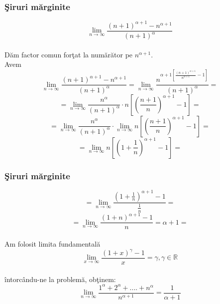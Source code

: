 \documentclass{beamer}
\theoremstyle{plain}
\begin{document}
\frame
{
\frametitle{\c Siruri m\u arginite}
\begin{displaymath}
 \lim_{n \to \infty }\frac{\left ( n+1 \right )^{\alpha +1}-n^{\alpha +1}}{\left ( n+1 \right )^{\alpha }}
\end{displaymath}
\\ D\u am factor comun for\c tat la num\u ar\u ator pe \(n^{\alpha +1}\). 
\\ Avem 
\begin{displaymath}
 \lim_{n \to \infty }\frac{\left ( n+1 \right )^{\alpha +1}-n^{\alpha +1}}{\left ( n+1 \right )^{\alpha }} = \lim_{n \to \infty }\frac{n^{\alpha +1\left [ \frac{\left ( n+1 \right )^{\alpha +1}}{n^{\alpha +1}} -1\right ]}}{\left ( n+1 \right )^{\alpha }} = 
\end{displaymath}
\begin{displaymath}
 = \lim_{n \to \infty }\frac{n^{\alpha }}{\left ( n+1 \right )^{\alpha }}\cdot n\left [ \left ( \frac{n+1}{n} \right )^{\alpha +1}-1 \right ] = 
\end{displaymath}
\begin{displaymath}
 =\lim_{n \to \infty }\frac{n^{\alpha }}{\left ( n+1 \right )^{\alpha }}\cdot \lim_{n \to \infty }n\left [ \left ( \frac{n+1}{n} \right )^{\alpha +1} -1\right ]=
\end{displaymath}
\begin{displaymath}
 =\lim_{n \to \infty }n\left [ \left ( 1+\frac{1}{n} \right )^{\alpha +1}-1 \right ]= 
\end{displaymath}
}
\frame
{
\frametitle{\c Siruri m\u arginite}
\begin{displaymath}
 = \lim_{n \to \infty }\frac{\left ( 1+\frac{1}{n} \right )^{\alpha +1}-1}{\frac{1}{n}}=
\end{displaymath}
\begin{displaymath}
 =\lim_{n \to \infty }\frac{\left ( 1+n \right )^{\alpha +1}-1}{n}= \alpha +1=
\end{displaymath}
\\ Am folosit limita fundamental\u a 
\begin{displaymath}
 \lim_{x \to \infty }\frac{\left ( 1+x \right )^{\gamma }-1}{x} = \gamma ,\gamma \in \mathbb{R}
\end{displaymath}
\\ \^ intorc\^ andu-ne la problem\u a, ob\c tinem:
\begin{displaymath}
 \lim_{n \to \infty }\frac{1^{\alpha }+2^{\alpha }+....+n^{\alpha }}{n^{\alpha +1}} = \frac{1}{\alpha +1}
\end{displaymath}
}
\end{document}
